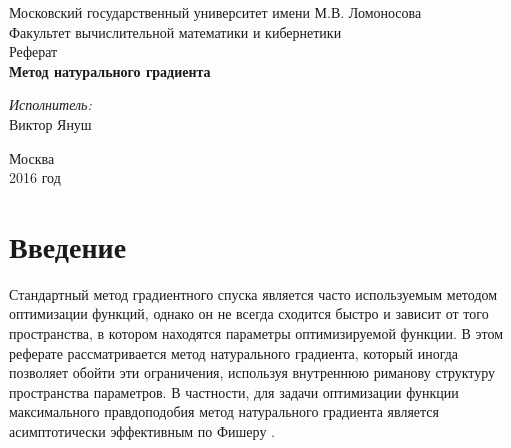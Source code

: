 \documentclass[a4paper,12pt]{article}
\begin{document}
\renewcommand{\sfdefault}{ptm}

\newcommand{\sumfromto}[3]{\overset{#2}{\underset{#1}{\sum}}{#3}}

\begin{titlepage}

\newcommand{\HRule}{\rule{\linewidth}{0.5mm}} %

\center 


\Large Московский государственный университет имени М.В. Ломоносова\\[1.5cm]
\Large Факультет вычислительной математики и кибернетики\\[0.5cm]
\large Реферат\\[0.5cm] 

{ \huge \bfseries Метод натурального градиента}\\[0.4cm] %

\begin{flushright} \large
\Large \emph{Исполнитель:}\\
Виктор Януш\\[3cm] 
\end{flushright}

\vfill 

{\large Москва \\ 2016 год}\\[3cm]

\end{titlepage}

 
\tableofcontents
\newpage


\section{Введение}

Стандартный метод градиентного спуска является часто используемым методом оптимизации функций,
однако он не всегда сходится быстро и зависит от того пространства, в котором находятся параметры
оптимизируемой функции. В этом реферате рассматривается метод натурального градиента, который иногда 
позволяет обойти эти ограничения, используя внутреннюю риманову структуру пространства параметров. 
В частности, для задачи оптимизации функции максимального правдоподобия метод натурального градиента 
является асимптотически эффективным по Фишеру \cite{AmariWorks}.
\end{document}
